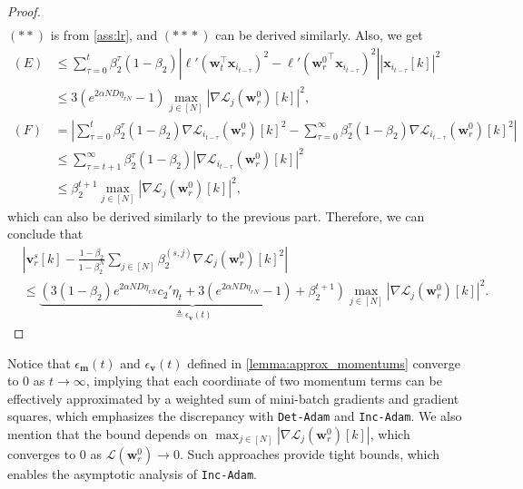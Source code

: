 \documentclass{article} %
\theoremstyle{plain}
\theoremstyle{definition}
\theoremstyle{remark}
\def\bigabs#1{\left|#1\right|}
\def\bigopen#1{\left(#1\right)}
\newcommand{\Ls}{\mathcal{L}}
\def\bm{{\mathbf m}}
\def\bx{{\mathbf x}}
\def\bw{{\mathbf w}}
\def\bv{{\mathbf v}}
\begin{document}
\begin{proof}
\begin{align*}
    \end{align*}
    $(**)$ is from \cref{ass:lr}, and $({**}{*})$ can be derived similarly. Also, we get
    \begin{align*}
        (E)&\leq \sum_{\tau=0}^t \beta_2^\tau(1-\beta_2)|\ell'(\bw_t^\top \bx_{i_{t-\tau}})^2 - \ell'({\bw_r^0}^\top \bx_{i_{t-\tau}})^2||\bx_{i_{t-\tau}}[k]|^2 \\
        & \leq 3(e^{2\alpha ND \eta_{rN}}-1)\max_{j \in [N]}|\nabla \Ls_j(\bw_r^0)[k]|^2, \\
        (F) &= \bigabs{\sum_{\tau=0}^{t}\beta_2^\tau(1-\beta_2)\nabla \Ls_{i_{t-\tau}}(\bw_r^0)[k]^2 - \sum_{\tau=0}^\infty\beta_2^\tau(1-\beta_2)\nabla\Ls_{i_{t-\tau}}(\bw_r^0)[k]^2} \\
        &\leq \sum_{\tau=t+1}^\infty\beta_2^\tau(1-\beta_2) \bigabs{\nabla \Ls_{i_{t-\tau}}(\bw_r^0)[k]}^2 \\
        & \leq \beta_2^{t+1}\max_{j \in [N]}|\nabla \Ls_j(\bw_r^0)[k]|^2,
    \end{align*}
    which can also be derived similarly to the previous part.
    Therefore, we can conclude that
    \begin{align*}
        &|\bv_r^s[k]-\frac{1-\beta_2}{1-\beta_2^N}\sum_{j \in [N]}\beta_2^{(s, j)}\nabla\Ls_{j}(\bw_r^0)[k]^2| \\
        &\leq \underbrace{\bigopen{3(1-\beta_2)e^{2\alpha ND \eta_{rN}}c_2'\eta_t+3(e^{2\alpha ND \eta_{rN}}-1)+\beta_2^{t+1}}}_{\triangleq \epsilon_\bv(t)}\max_{j \in [N]}|\nabla \Ls_j(\bw_r^0)[k]|^2.
    \end{align*}
\end{proof}

Notice that $\epsilon_\bm(t)$ and $\epsilon_\bv(t)$ defined in \cref{lemma:approx_momentums} converge to 0 as $t\rightarrow \infty$, implying that each coordinate of two momentum terms can be effectively approximated by a weighted sum of mini-batch gradients and gradient squares, which emphasizes the discrepancy with \texttt{Det-Adam} and \texttt{Inc-Adam}. We also mention that the bound depends on $\max_{j \in [N]}|\nabla \Ls_j(\bw_r^0)[k]|$, which converges to 0 as $\Ls(\bw_r^0) \rightarrow 0$. Such approaches provide tight bounds, which enables the asymptotic analysis of \texttt{Inc-Adam}.
\end{document}
